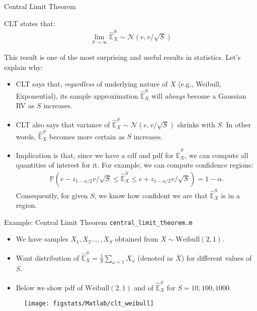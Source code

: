 \documentclass[handout,9pt]{beamer}
\begin{document}
%
\begin{frame}{Central Limit Theorem}

\begin{block}{}
CLT states that:
\begin{align*}
\lim_{S\to \infty}\hat{\mathbb{E}}_X^S\sim \mathcal{N}(e,v/\sqrt{S})
\end{align*}
\end{block}

This result is one of the most surprising and useful results in statistics. Let's explain why:

\begin{itemize}
\setlength{\itemsep}{10pt}
\item CLT says that, {\em regardless} of underlying nature of $X$ (e.g., Weibull, Exponential), its sample approximation $\hat{\mathbb{E}}_X^S$ will {\em always} become a Gaussian RV as $S$ increases.  

\item CLT also says that variance of $\hat{\mathbb{E}}_X^S\sim \mathcal{N}(e,v/\sqrt{S})$ shrinks with $S$. In other words, $\hat{\mathbb{E}}_X^S$ becomes more certain as $S$ increases.

\item Implication is that, since we have a cdf and pdf for $\hat{\mathbb{E}}_X^S$, we can compute all quantities of interest for it. For example, we can compute confidence regions:
\begin{align*}
\mathbb{P}\left(e-z_{1-\alpha/2}v/\sqrt{S}\leq \hat{\mathbb{E}}_X^S\leq e+z_{1-\alpha/2}v/\sqrt{S}\right)=1-\alpha.
\end{align*}
Consequently, for given $S$, we know how confident we are that $\hat{\mathbb{E}}_X^S$ is in a region.  

\end{itemize}


\end{frame}

%
\begin{frame}{Example: Central Limit Theorem \footnotesize{\texttt{central\_limit\_theorem.m}}}

\begin{itemize}
\setlength{\itemsep}{5pt}
\item We have samples $X_1,X_2...,,X_S$ obtained from $X\sim \textrm{Weibull}(2,1)$.
\item Want distribution of $\hat{\mathbb{E}}_X^S=\frac{1}{S}\sum_{\omega=1}X_\omega$ (denoted as $\bar{X}$) for different values of $S$.
\item Below we show pdf of $\textrm{Weibull}(2,1)$ and of $\hat{\mathbb{E}}_X^S$ for $S=10,100,1000$.
\end{itemize}
\begin{figure}[!htb]
    \centering
	\texttt{[image: figstats/Matlab/clt\_weibull]}
\end{figure}
\end{frame}
\end{document}
